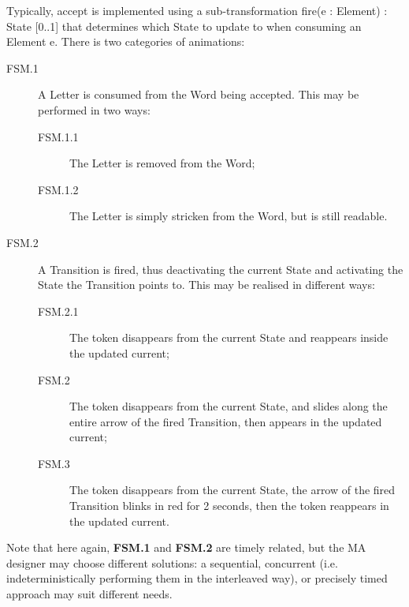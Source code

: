Typically, \textsf{accept} is implemented using a sub-transformation 
\textsf{fire(e : Element) : State [0..1]} that determines which \textsf{State} 
to update to when consuming an \textsf{Element} \textsf{e}.
There is two categories of animations:
\begin{description}
   \item[FSM.1] A \textsf{Letter} is consumed from the \textsf{Word} being 
   accepted. This may be performed in two ways:
   \begin{description}
      \item[FSM.1.1] The \textsf{Letter} is removed from the \textsf{Word};
      \item[FSM.1.2] The \textsf{Letter} is simply stricken from the \textsf{Word},
      but is still readable.
   \end{description}
   \item[FSM.2] A \textsf{Transition} is fired, thus deactivating the current
   \textsf{State} and activating the \textsf{State} the \textsf{Transition} points to.
   This may be realised in different ways:
   \begin{description}
      \item[FSM.2.1] The token disappears from the \textsf{current} \textsf{State}
      and reappears inside the updated \textsf{current}; 
      \item[FSM.2] The token disappears from the \textsf{current} \textsf{State},
      and slides along the entire arrow of the fired \textsf{Transition}, then 
      appears in the updated \textsf{current};
      \item[FSM.3] The token disappears from the \textsf{current} \textsf{State},
      the arrow of the fired \textsf{Transition} blinks in red for 2 seconds, 
      then the token reappears in the updated \textsf{current}.
   \end{description}
\end{description}
Note that here again, \textbf{FSM.1} and \textbf{FSM.2} are timely related, but 
the MA designer may choose different solutions: a sequential, concurrent (i.e.
indeterministically performing them in the interleaved way), or precisely timed
approach may suit different needs.

